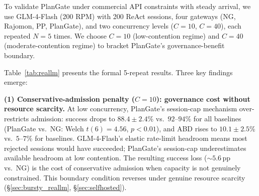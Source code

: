 \documentclass[sigconf,review,anonymous]{acmart}
\begin{document}
To validate PlanGate under commercial API constraints with steady arrival, we use GLM-4-Flash (200 RPM) with 200 ReAct sessions, four gateways (NG, Rajomon, PP, PlanGate), and two concurrency levels ($C{=}10$, $C{=}40$), each repeated $N{=}5$ times. We choose $C{=}10$ (low-contention regime) and $C{=}40$ (moderate-contention regime) to bracket PlanGate's governance-benefit boundary.

\begin{table}[t]
\caption{Real-LLM validation on GLM-4-Flash ($N{=}5$ runs, mean$\pm$std). 200 ReAct sessions per run. $C{=}10$: PlanGate's conservative admission causes a success penalty ($88.4$\% vs.\ $92$--$94$\% baselines, $p{<}0.01$). $C{=}40$: no-regret regime (comparable success, lowest P95).}
\label{tab:reallm}
\small
{}
\end{table}

Table~\ref{tab:reallm} presents the formal 5-repeat results. Three key findings emerge:

\textbf{(1) Conservative-admission penalty ($C{=}10$): governance cost without resource scarcity.}
At low concurrency, PlanGate's session-cap mechanism over-restricts admission: success drops to $88.4\pm2.4$\% vs.\ $92$--$94$\% for all baselines (PlanGate vs.\ NG: Welch $t(6){=}4.56$, $p{<}0.01$), and ABD rises to $10.1\pm2.5$\% vs.\ $5$--$7$\% for baselines. GLM-4-Flash's elastic rate-limit headroom means most rejected sessions would have succeeded; PlanGate's session-cap underestimates available headroom at low contention. The resulting success loss (${{\sim}}5.6$\,pp vs.\ NG) is the cost of conservative admission when capacity is not genuinely constrained. This boundary condition reverses under genuine resource scarcity (\S\ref{sec:bursty_reallm}, \S\ref{sec:selfhosted}).
\end{document}
